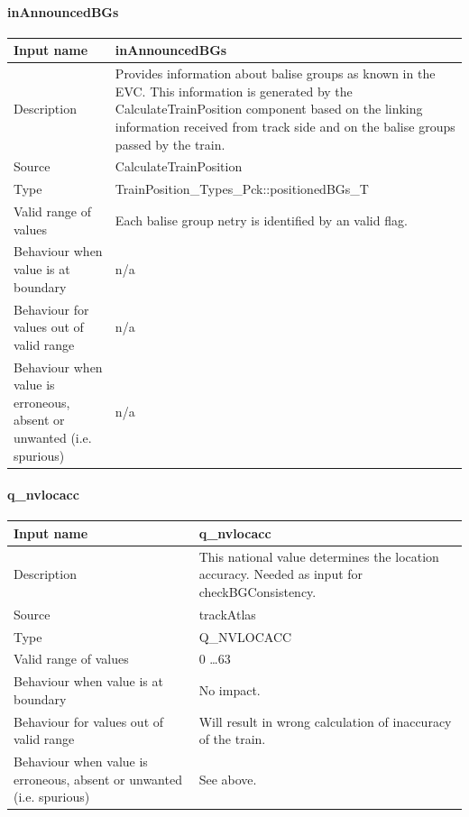 \paragraph{inAnnouncedBGs}

\begin{longtable}{p{}p{}}
\toprule
Input name				& inAnnouncedBGs \\
\midrule
Description				& Provides information about balise groups as known in the EVC. This information is generated by the CalculateTrainPosition component based on the linking information received from track side and on the balise groups passed by the train.\\
\midrule
Source					& CalculateTrainPosition \\ 
\midrule
Type					& TrainPosition\_Types\_Pck::positionedBGs\_T \\
\midrule
Valid range of values	& Each balise group netry is identified by an valid flag. \\
\midrule
Behaviour when value is at boundary	& n/a\\
\midrule
Behaviour for values out of valid range	& n/a\\
\midrule
Behaviour when value is erroneous, absent or unwanted (i.e. spurious) & n/a\\
\bottomrule
\end{longtable}


\paragraph{q\_nvlocacc}

\begin{longtable}{p{}p{}}
\toprule
Input name				& q\_nvlocacc \\
\midrule
Description				& This national value determines the location accuracy. Needed as input for checkBGConsistency.  \\
\midrule
Source					& trackAtlas\\ 
\midrule
Type					& Q\_NVLOCACC \\
\midrule
Valid range of values	& 0 \ldots 63\\
\midrule
Behaviour when value is at boundary	& No impact.\\
\midrule
Behaviour for values out of valid range	& Will result in wrong calculation of inaccuracy of the train.\\
\midrule
Behaviour when value is erroneous, absent or unwanted (i.e. spurious) & See above.\\
\bottomrule
\end{longtable}



